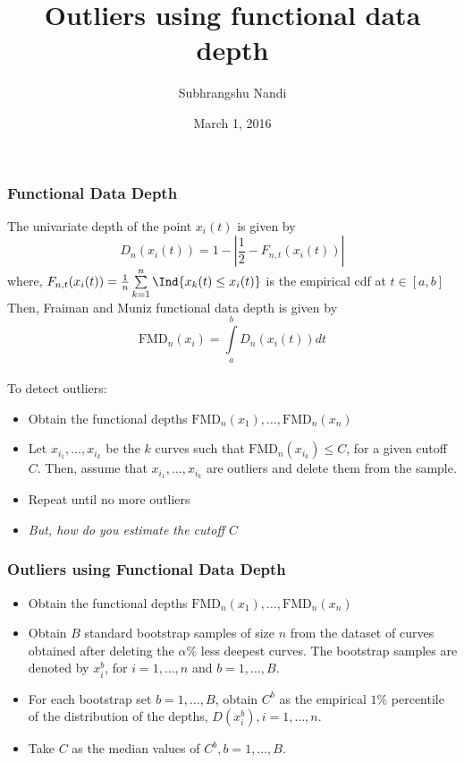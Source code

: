 \documentclass[10pt,dvipsnames,table]{beamer}
\title[Outliers]{Outliers using functional data depth}
\author{Subhrangshu Nandi}
\institute[Prelim exam]{Preliminary Exam \\
Department of Statistics \\
University of Wisconsin-Madison}
\date{March 1, 2016}
\begin{document}
\setlength{\baselineskip}{16truept}


\begin{frame}
\frametitle{Functional Data Depth}
The univariate depth of the point $x_i(t)$ is given by
\[ D_n(x_i(t)) = 1 - \left| \frac{1}{2} - F_{n,t} (x_i (t)) \right| \]
where, $F_{n,t} (x_i (t)) = \frac{1}{n}\sum\limits_{k=1}^{n}\Ind\{ x_k(t) \leq x_i(t)\}$ is the empirical cdf at $t \in [a,b]$ \\
Then, Fraiman and Muniz functional data depth is given by
\[ \text{FMD}_n(x_i) = \int\limits_a^b D_n(x_i(t)) dt\] \\
To detect outliers:
\begin{itemize}
\item Obtain the functional depths $\text{FMD}_n(x_1), \dots, \text{FMD}_n(x_n)$
\item Let $x_{i_1}, \dots, x_{i_k}$ be the $k$ curves such that $\text{FMD}_n (x_{i_k}) \leq C$, for a given cutoff $C$. Then, assume that $x_{i_1}, \dots, x_{i_k}$ are outliers and delete them from the sample.
\item Repeat until no more outliers
\item {\emph{But, how do you estimate the cutoff $C$}}
\end{itemize}
\end{frame}

\begin{frame}
\frametitle{Outliers using Functional Data Depth}
\begin{itemize}
\item Obtain the functional depths $\text{FMD}_n(x_1), \dots, \text{FMD}_n(x_n)$
\item Obtain $B$ standard bootstrap samples of size $n$ from the dataset of curves obtained after deleting the $\alpha \%$ less deepest curves. The bootstrap samples are denoted by $x_i^b$, for $i = 1, \dots, n$ and $b = 1, \dots, B$.
\item For each bootstrap set $b = 1, \dots, B$, obtain $C^b$ as the empirical $1\%$ percentile of the distribution of the depths, $D(x_i^b), i = 1, \dots, n$.
\item Take $C$ as the median values of $C^b, b = 1, \dots, B$.
\end{itemize}
\end{frame}
\end{document}
